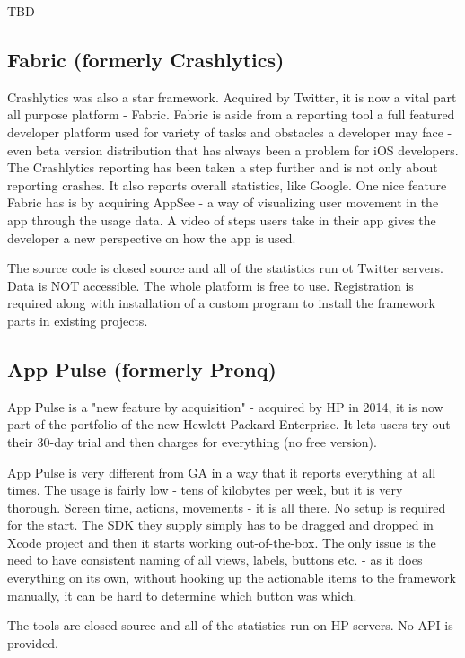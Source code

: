 TBD

\subsection{Fabric (formerly Crashlytics)}

Crashlytics was also a star framework. Acquired by Twitter, it is now a vital part all purpose platform - Fabric. Fabric is aside from a reporting tool a full featured developer platform used for variety of tasks and obstacles a developer may face - even beta version distribution that has always been a problem for iOS developers. The Crashlytics reporting has been taken a step further and is not only about reporting crashes. It also reports overall statistics, like Google. One nice feature Fabric has is by acquiring AppSee - a way of visualizing user movement in the app through the usage data. A video of steps users take in their app gives the developer a new perspective on how the app is used.

The source code is closed source and all of the statistics run ot Twitter servers. Data is NOT accessible. The whole platform is free to use. Registration is required along with installation of a custom program to install the framework parts in existing projects.


\subsection{App Pulse (formerly Pronq)}

App Pulse is a "new feature by acquisition" - acquired by HP in 2014, it is now part of the portfolio of the new Hewlett Packard Enterprise. It lets users try out their 30-day trial and then charges for everything (no free version).

App Pulse is very different from GA in a way that it reports everything at all times. The usage is fairly low - tens of kilobytes per week, but it is very thorough. Screen time, actions, movements - it is all there. No setup is required for the start. The SDK they supply simply has to be dragged and dropped in Xcode project and then it starts working out-of-the-box. The only issue is the need to have consistent naming of all views, labels, buttons etc. - as it does everything on its own, without hooking up the actionable items to the framework manually, it can be hard to determine which button was which.

The tools are closed source and all of the statistics run on HP servers. No API is provided.



